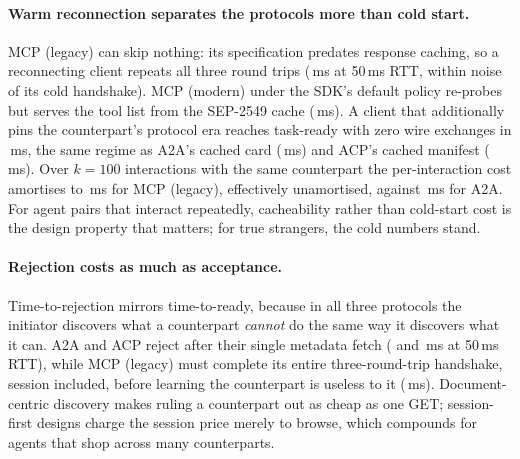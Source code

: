 \documentclass{article}
\newcommand{\mcpl}{MCP (legacy)}
\newcommand{\mcpm}{MCP (modern)}
\begin{document}
\paragraph{Warm reconnection separates the protocols more than cold start.}
\mcpl{} can skip nothing: its specification predates response caching, so a
reconnecting client repeats all three round trips
(\STwoMcpLegacyWarmRttMed{}\,ms at 50\,ms RTT, within noise of its cold
handshake). \mcpm{} under the SDK's default policy re-probes but serves the
tool list from the SEP-2549 cache (\STwoMcpModernWarmRttMed{}\,ms). A
client that additionally pins the counterpart's protocol era reaches
task-ready with zero wire exchanges in \STwoMcpPinnedWarmRttMed{}\,ms, the
same regime as A2A's cached card (\STwoAtoaWarmRttMed{}\,ms) and ACP's
cached manifest (\STwoAcpWarmRttMed{}\,ms). Over $k{=}100$ interactions
with the same counterpart the per-interaction cost amortises to
\AmortMcpLegacy{}\,ms for \mcpl{}, effectively unamortised, against
\AmortAtoa{}\,ms for A2A. For agent pairs that interact repeatedly,
cacheability rather than cold-start cost is the design property that
matters; for true strangers, the cold numbers stand.

\paragraph{Rejection costs as much as acceptance.}
Time-to-rejection mirrors time-to-ready, because in all three protocols the
initiator discovers what a counterpart \emph{cannot} do the same way it
discovers what it can. A2A and ACP reject after their single metadata fetch
(\SThreeAtoaRttMed{} and \SThreeAcpRttMed{}\,ms at 50\,ms RTT), while
\mcpl{} must complete its entire three-round-trip handshake, session
included, before learning the counterpart is useless to it
(\SThreeMcpLegacyRttMed{}\,ms). Document-centric discovery makes ruling a
counterpart out as cheap as one GET; session-first designs charge the
session price merely to browse, which compounds for agents that shop across
many counterparts.
\end{document}
